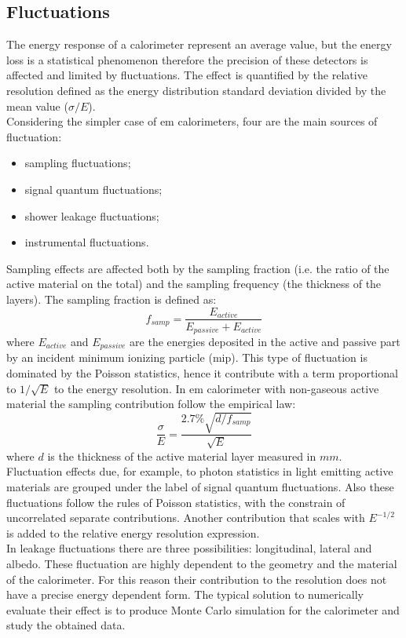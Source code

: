 \subsection{Fluctuations}
The energy response of a calorimeter represent an average value, but the energy loss is a statistical phenomenon therefore the precision of these detectors is affected and limited by fluctuations. The effect is quantified by the relative resolution defined as the energy distribution standard deviation divided by the mean value ($\sigma/E$).\\
Considering the simpler case of em calorimeters, four are the main sources of fluctuation:
\begin{itemize}
    \item sampling fluctuations;
    \item signal quantum fluctuations;
    \item shower leakage fluctuations;
    \item instrumental fluctuations.
\end{itemize}
Sampling effects are affected both by the sampling fraction (i.e. the ratio of the active material on the total) and the sampling frequency (the thickness of the layers). The sampling fraction is  defined as:
\begin{equation}
    f_{samp} = \frac{E_{active}}{E_{passive}+E_{active}}
\end{equation}
where $E_{active}$ and $E_{passive}$ are the energies deposited in the active and passive part by an incident minimum ionizing particle (mip).
This type of fluctuation is dominated by the Poisson statistics, hence it contribute with a term proportional to $1/\sqrt{E}$ to the energy resolution.
In em calorimeter with non-gaseous active material the sampling contribution follow the empirical law:
\begin{equation}
    \frac{\sigma}{E} = \frac{2.7\% \sqrt{d/f_{samp}}}{\sqrt{E}}
\end{equation}
where $d$ is the thickness of the active material layer measured in $mm$.\\
Fluctuation effects due, for example, to photon statistics in light emitting active materials are grouped under the label of signal quantum fluctuations. Also these fluctuations follow the rules of Poisson statistics, with the constrain of uncorrelated separate contributions. Another contribution that scales with $E^{-1/2}$ is added to the relative energy resolution expression.\\
In leakage fluctuations there are three possibilities: longitudinal, lateral and albedo. These fluctuation are highly dependent to the geometry and the material of the calorimeter. For this reason their contribution to the resolution does not have a precise energy dependent form. The typical solution to numerically evaluate their effect is to produce Monte Carlo simulation for the calorimeter and study the obtained data.\\
